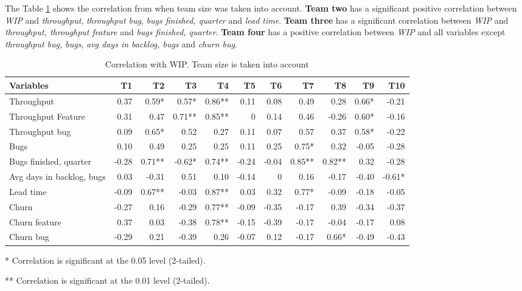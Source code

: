 \documentclass[UKenglish]{ifimaster}  %
\begin{document}
The Table \ref{corr:WIP:V2} shows the correlation from when team size was taken into account. \textbf{Team two} has a significant positive correlation between \textit{WIP} and \textit{throughput}, \textit{throughput bug},  \textit{bugs finished, quarter} and \textit{lead time}. \textbf{Team three} has a significant correlation between \textit{WIP} and \textit{throughput, throughput feature} and \textit{bugs finished, quarter}. \textbf{Team four} has a positive correlation between \textit{WIP} and all variables except \textit{throughput bug, bugs}, \textit{avg days in backlog, bugs} and \textit{churn bug}. 



\begin{table}[h]
 \caption{Correlation with WIP. Team size is taken into account}
  \begin{adjustwidth}{-1.5cm}{}
 \center
  \captionsetup{justification=centering}
 \begin{tabular}{|l|r|r|r|r|r|r|r|r|r|r|}
\hline
 \textbf{Variables} & \bf{T1} & \bf{T2} & \bf{T3} & \bf{T4} & \bf{T5} & \bf{T6} & \bf{T7} & \bf{T8} & \bf{T9} & \bf{T10}\\ \hline
 Throughput  & 0.37 & 0.59* & 0.57* & 0.86** & 0.11 & 0.08 & 0.49 & 0.28 & 0.66* & -0.21 \\ \hline
 Throughput Feature  & 0.31 & 0.47 & 0.71** & 0.85** & 0 &0.14 & 0.46 & -0.26 & 0.60* & -0.16 \\ \hline
 Throughput bug  & 0.09 & 0.65* & 0.52 & 0.27 & 0.11 & 0.07 & 0.57 & 0.37 & 0.58* & -0.22 \\ \hline
 Bugs  & 0.10 & 0.49 & 0.25 & 0.25 & 0.11 & 0.25 & 0.75* & 0.32 & -0.05 & -0.28 \\ \hline
 Bugs finished, quarter  & -0.28 & 0.71** & -0.62* & 0.74** & -0.24 & -0.04 & 0.85** & 0.82** & 0.32 & -0.28 \\ \hline
 Avg days in backlog, bugs  & 0.03 & -0.31 & 0.51 & 0.10 & -0.14 & 0 &0.16 & -0.17 & -0.40 & -0.61* \\ \hline
 Lead time  & -0.09 & 0.67** & -0.03 & 0.87** & 0.03 & 0.32 & 0.77* & -0.09 & -0.18 & -0.05 \\ \hline
 Churn  & -0.27 & 0.16 & -0.29 & 0.77** & -0.09 & -0.35 & -0.17 & 0.39 & -0.34 & -0.37 \\ \hline
 Churn feature  & 0.37 & 0.03 & -0.38 & 0.78** & -0.15 & -0.39 & -0.17 & -0.04 & -0.17 & 0.08 \\ \hline
 Churn bug  & -0.29 & 0.21 & -0.39 & 0.26 & -0.07 & 0.12 & -0.17 & 0.66* & -0.49 & -0.43 \\ \hline
\end{tabular}
 \label{corr:WIP:V2}
 \centerline {* Correlation is significant at the 0.05 level (2-tailed).}
\centerline{** Correlation is significant at the 0.01 level (2-tailed).}
\end{adjustwidth}
\end{table}
\end{document}

